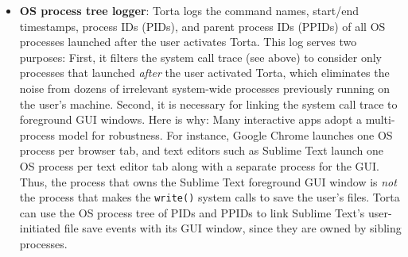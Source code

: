 \begin{itemize}
\item \textbf{OS process tree logger}: Torta logs the command names,
start/end timestamps, process IDs (PIDs), and parent process IDs (PPIDs)
of all OS processes launched after the user activates Torta. This log
serves two purposes: First, it filters the system call trace (see above)
to consider only processes that launched \emph{after} the user activated Torta,
which eliminates the noise from dozens of irrelevant system-wide
processes previously running on the user's machine. Second, it is
necessary for linking the system call trace to foreground GUI windows.
Here is why: Many interactive apps adopt a multi-process model for
robustness. For instance, Google Chrome launches one OS process per
browser tab, and text editors such as Sublime Text launch one OS process
per text editor tab along with a separate process for the GUI. Thus, the
process that owns the Sublime Text foreground GUI window is \emph{not}
the process that makes the {\small \texttt{write()}} system calls to
save the user's files. Torta can use the OS process tree of
PIDs and PPIDs to link Sublime Text's user-initiated file save events with its GUI
window, since they are owned by sibling processes.

\end{itemize}


